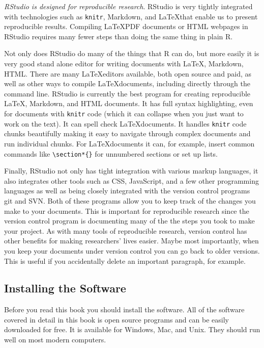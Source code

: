 \documentclass[ChapterTOCs,krantz1]{krantz}\usepackage{graphicx, color}
\begin{document}
{\emph{RStudio is designed for reproducible research}}. RStudio is very tightly integrated with technologies such as {\tt{knitr}}, Markdown, and \LaTeX that enable us to present reproducible results. Compiling \LaTeX PDF documents or HTML webpages in RStudio requires many fewer steps than doing the same thing in plain R. 

Not only does RStudio do many of the things that R can do, but more easily it is very good stand alone editor for writing documents with \LaTeX, Markdown, HTML. There are many \LaTeX editors available, both open source and paid, as well as other ways to compile \LaTeX documents, including directly through the command line. RStudio is currently the best program for creating reproducible \LaTeX, Markdown, and HTML documents. It has full syntax highlighting, even for documents with \texttt{knitr} code (which it can collapse when you just
want to work on the text). It can spell check \LaTeX documents. It handles \texttt{knitr} code chunks beautifully making it easy to navigate through complex documents and run individual chunks. For \LaTeX documents it can, for example, insert common commands like \texttt{\textbackslash{}section*\{\}} for unnumbered sections or set up lists. 

Finally, RStudio not only has tight integration with various markup languages, it also integrates other tools such as CSS, JavaScript, and a few other programming languages as well as being closely integrated with the version control programs git and SVN. Both of these programs allow you to keep track of the changes you make to your documents. This is important for reproducible research since the version control program is documenting many of the the steps you took to make your project. As with many tools of reproducible research, version control has other benefits for making researchers' lives easier. Maybe most importantly, when you keep your documents under version control you can go back to older versions. This is useful if you accidentally delete an important paragraph, for example.

\subsection{Installing the Software}

Before you read this book you should install the software. All of the software covered in detail in this book is open source programs and can be easily downloaded for free. It is available for Windows, Mac, and Unix. They should run well on most modern computers. 
\end{document}
